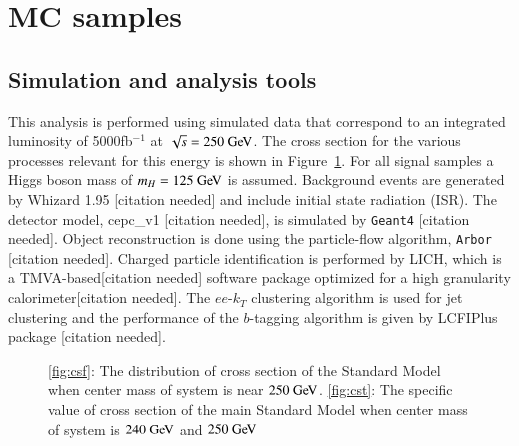 \documentclass[11pt,a4paper]{cepcnote}
\begin{document}
\section{MC samples}
\subsection{Simulation and analysis tools}
This analysis is performed using simulated data that correspond to an integrated luminosity of 5000fb$^{-1}$ at $\sqrt s =250\gev$.
The cross section for the various processes relevant for this energy is shown in Figure~\ref{fig:cs}. 
For all signal samples a Higgs boson mass of $m_H = 125\gev$ is assumed. Background events are generated by Whizard 1.95 {\color{red}[citation needed]} and include initial state radiation (ISR). 
The detector model, cepc\_v1 {\color{red}[citation needed]}, is simulated by {\tt Geant4} {\color{red}[citation needed]}. Object reconstruction is done using the particle-flow algorithm, {\tt Arbor} {\color{red}[citation needed]}.
Charged particle identification is performed by LICH, which is a TMVA-based{\color{red}[citation needed]} software package optimized for a high granularity calorimeter{\color{red}[citation needed]}. 
The $ee$-$k_T$ clustering algorithm is used for jet clustering and the performance of the $b$-tagging algorithm is given by LCFIPlus package {\color{red}[citation needed]}.

\begin{figure}[H]
	\centering
	\caption[]{\ref{fig:csf}: The distribution of cross section of the Standard Model when center mass of system is near $250\gev$.
	\ref{fig:cst}: The specific value of cross section of the main Standard Model when center mass of system is $240\gev$ and $250\gev$}
	\label{fig:cs}
\end{figure}
\end{document}
